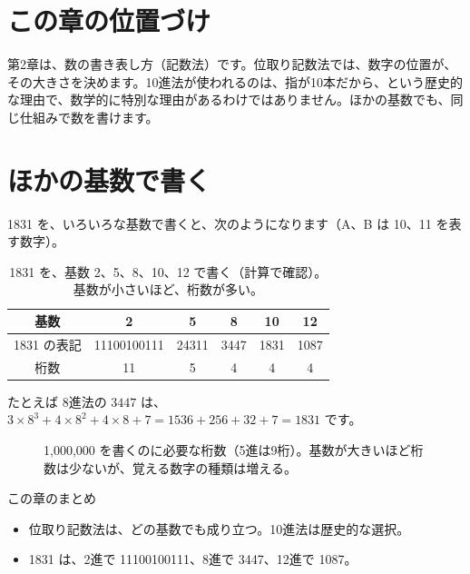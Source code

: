 \documentclass[a4paper,11pt,openany]{ltjsbook}
\begin{document}
\section{この章の位置づけ}

第2章は、数の書き表し方（記数法）です。位取り記数法では、数字の位置が、その大きさを決めます。10進法が使われるのは、指が10本だから、という歴史的な理由で、数学的に特別な理由があるわけではありません。ほかの基数でも、同じ仕組みで数を書けます。

\section{ほかの基数で書く}

1831 を、いろいろな基数で書くと、次のようになります（A、B は 10、11 を表す数字）。

\begin{table}[htbp]
\centering
\begin{tabular}{c|ccccc}
\toprule
基数 & 2 & 5 & 8 & 10 & 12\\
\midrule
1831 の表記 & 11100100111 & 24311 & 3447 & 1831 & 1087\\
桁数 & 11 & 5 & 4 & 4 & 4\\
\bottomrule
\end{tabular}
\caption{1831 を、基数 2、5、8、10、12 で書く（計算で確認）。基数が小さいほど、桁数が多い。}
\end{table}

たとえば 8進法の $3447$ は、$3\times8^3+4\times8^2+4\times8+7=1536+256+32+7=1831$ です。

\begin{figure}[htbp]
\centering
{}
\caption{1,000,000 を書くのに必要な桁数（5進は9桁）。基数が大きいほど桁数は少ないが、覚える数字の種類は増える。}
\end{figure}

\begin{pointbox}{この章のまとめ}
\begin{itemize}[leftmargin=*]
\item 位取り記数法は、どの基数でも成り立つ。10進法は歴史的な選択。
\item 1831 は、2進で 11100100111、8進で 3447、12進で 1087。
\end{itemize}
\end{pointbox}
\end{document}
